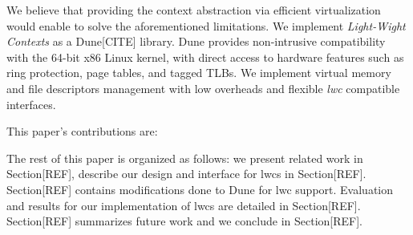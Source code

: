 We believe that providing the context abstraction via efficient virtualization would enable
to solve the aforementioned limitations.
We implement \textit{Light-Wight Contexts} as a Dune[CITE] library.
Dune provides non-intrusive compatibility with the 64-bit x86 Linux kernel, with direct access
to hardware features such as ring protection, page tables, and tagged TLBs.
We implement virtual memory and file descriptors management with low overheads and flexible \textit{lwc} compatible interfaces.

This paper's contributions are: 

The rest of this paper is organized as follows: we present related work in Section[REF], describe 
our design and interface for lwcs in Section[REF]. Section[REF] contains modifications done to Dune for lwc support.
Evaluation and results for our implementation of lwcs are detailed in Section[REF].
Section[REF] summarizes future work and we conclude in Section[REF].


